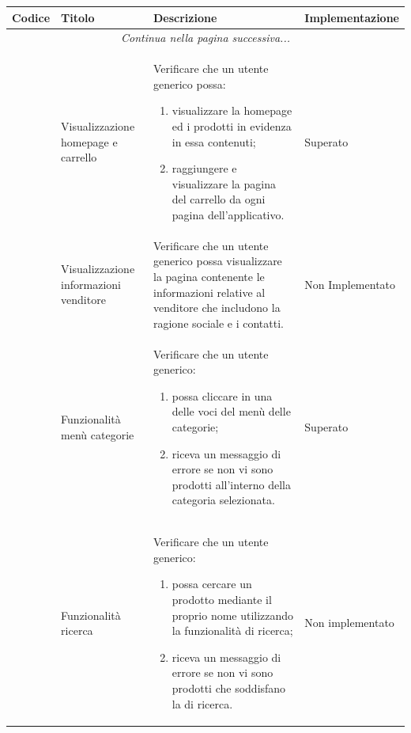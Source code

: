 \begin{center}
	\begin{longtable}{|p{0.85cm}|p{2.25cm}|p{9cm}|p{3cm}|}
		\hline
		\rowcolor{lighter-grayer}
		\textbf{Codice} & \textbf{Titolo} & \textbf{Descrizione} & \textbf{Implementazione} \\
		\hline
		\endfirsthead
		\hline
		\multicolumn{4}{|c|}{\textit{Continua nella pagina successiva...}} \\
		\hline
		\endfoot
		\endlastfoot

		\hline
		
		 & Visualizzazione homepage e carrello & Verificare che un utente generico possa:
		\begin{enumerate}
			\item  visualizzare la homepage ed i prodotti in evidenza in essa contenuti;
			\item  raggiungere e visualizzare la pagina del carrello da ogni pagina dell'applicativo.
		\end{enumerate} & Superato\\

		 & Visualizzazione informazioni venditore & Verificare che un utente generico possa visualizzare la pagina contenente le informazioni relative al venditore che includono la ragione sociale e i contatti. & Non Implementato \\

		 & Funzionalità menù categorie & Verificare che un utente generico: 
		\begin{enumerate}
			\item  possa cliccare in una delle voci del menù delle categorie;
			\item  riceva un messaggio di errore se non vi sono prodotti all'interno della categoria selezionata.
		\end{enumerate} & Superato\\

		 & Funzionalità ricerca & Verificare che un utente generico: 
		\begin{enumerate}
			\item  possa cercare un prodotto mediante il proprio nome utilizzando la funzionalità di ricerca;
			\item  riceva un messaggio di errore se non vi sono prodotti che soddisfano la \glock{query} di ricerca.
		\end{enumerate} & Non implementato \\


\end{longtable}
\end{center}
